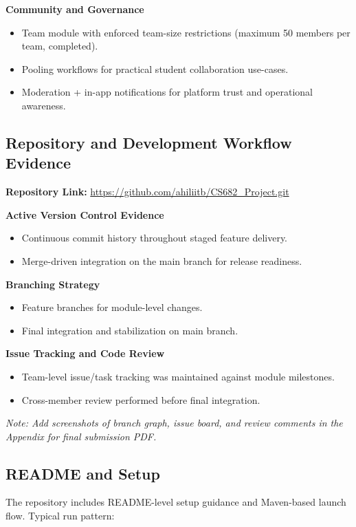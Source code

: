 \documentclass[12pt,a4paper]{article}
\begin{document}
\textbf{Community and Governance}
\begin{itemize}[leftmargin=*]
    \item Team module with enforced team-size restrictions (maximum 50 members per team, completed).
    \item Pooling workflows for practical student collaboration use-cases.
    \item Moderation + in-app notifications for platform trust and operational awareness.
\end{itemize}

\subsection{Repository and Development Workflow Evidence}
\textbf{Repository Link:} \url{https://github.com/ahiliitb/CS682_Project.git}

\textbf{Active Version Control Evidence}
\begin{itemize}[leftmargin=*]
    \item Continuous commit history throughout staged feature delivery.
    \item Merge-driven integration on the main branch for release readiness.
\end{itemize}

\textbf{Branching Strategy}
\begin{itemize}[leftmargin=*]
    \item Feature branches for module-level changes.
    \item Final integration and stabilization on main branch.
\end{itemize}

\textbf{Issue Tracking and Code Review}
\begin{itemize}[leftmargin=*]
    \item Team-level issue/task tracking was maintained against module milestones.
    \item Cross-member review performed before final integration.
\end{itemize}

\textit{Note: Add screenshots of branch graph, issue board, and review comments in the Appendix for final submission PDF.}

\subsection{README and Setup}
The repository includes README-level setup guidance and Maven-based launch flow. Typical run pattern:
\end{document}
